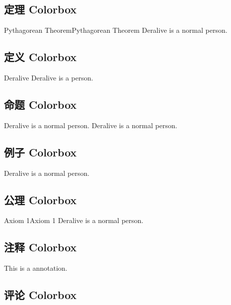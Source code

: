 \documentclass[14pt,a4paper,UTF8,twoside]{article}
\begin{document}
\subsection{定理 Colorbox}

\begin{thm}{Pythagorean Theorem}{Pythagorean Theorem}
	Deralive is a normal person.
\end{thm}

\subsection{定义 Colorbox}

\begin{dfn}{Deralive}{}
	Deralive is a person.
\end{dfn}

\subsection{命题 Colorbox}

\begin{prp}{Deralive is a normal person.}{}
	Deralive is a normal person.
\end{prp}

\subsection{例子 Colorbox}

\begin{cth}
	Deralive is a normal person.
\end{cth}

\subsection{公理 Colorbox}

\begin{axm}{Axiom 1}{Axiom 1}
	Deralive is a normal person.
\end{axm}

\subsection{注释 Colorbox}

\begin{ctt}
	This is a annotation.
\end{ctt}

\subsection{评论 Colorbox}
\end{document}
